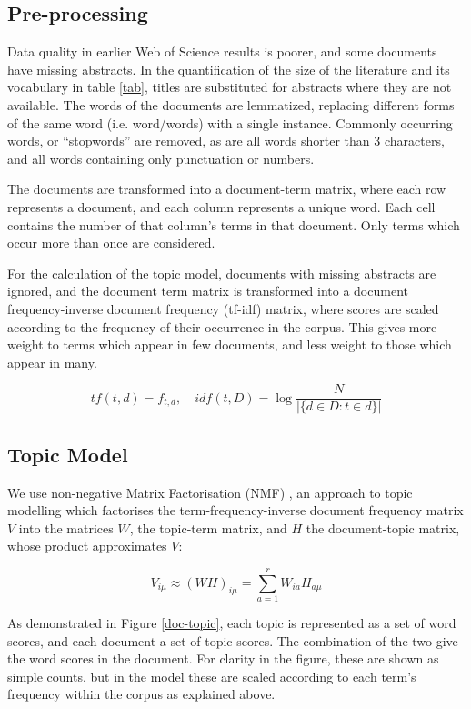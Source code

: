 \documentclass{article}
\begin{document}
\begin{linenumbers}
		
	\subsection*{Pre-processing}
	
	Data quality in earlier Web of Science results is poorer, and some documents have missing abstracts. In the quantification of the size of the literature and its vocabulary in table \ref{tab}, titles are substituted for abstracts where they are not available.  The words of the documents are lemmatized, replacing different forms of the same word (i.e. word/words) with a single instance. Commonly occurring words, or ``stopwords'' are removed, as are all words shorter than 3 characters, and all words containing only punctuation or numbers.
	
	The documents are transformed into a document-term matrix, where each row represents a document, and each column represents a unique word.  Each cell contains the number of that column's terms in that document. Only terms which occur more than once are considered.
	
	For the calculation of the topic model, documents with missing abstracts are ignored, and the document term matrix is transformed into a document
	frequency-inverse document frequency (tf-idf) matrix, where scores are scaled according to the frequency of their occurrence in the corpus. This gives more weight to terms which appear in few documents, and less weight to those which appear in many.
	
	\begin{equation}
	tf(t,d) = f_{t,d} \mathrm{,}\quad idf(t,D) = \log\frac{N}{|\{d \in D:t \in d\}|}
	\end{equation} 
	
	\subsection*{Topic Model}
	
	We use non-negative Matrix Factorisation (NMF) \cite{Lee1999}, an approach to topic modelling which factorises the term-frequency-inverse document frequency matrix \( V \) into the matrices \(W\), the topic-term matrix, and \( H \) the document-topic matrix, whose product approximates \(V\):
	
	\begin{equation}
		V_{i\mu} \approx (WH)_{i\mu} = \sum_{a=1}^{r}W_{ia}H_{a\mu}
	\end{equation}
	
	As demonstrated in Figure \ref{doc-topic}, each topic is represented as a set of word scores, and each document a set of topic scores. The combination of the two give the word scores in the document. For clarity in the figure, these are shown as simple counts, but in the model these are scaled according to each term's frequency within the corpus as explained above.
	

\end{linenumbers}
\end{document}
